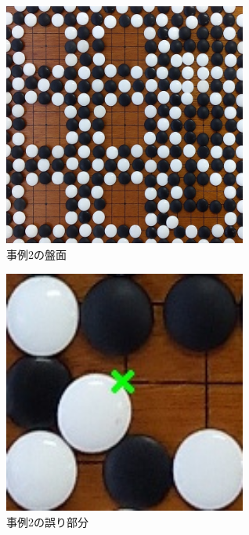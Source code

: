 \documentclass[openright]{nitocs}
\numberwithin{equation}{section}
\begin{document}
                \begin{figure}[tb] %
                    \begin{center}
                    \includegraphics[clip,width=80mm]{DSC_0099/boardImg.jpg} 
                    \caption{事例2の盤面}
                    \label{ex2}
                    \end{center}
                \end{figure}

                \begin{figure}[tb] %
                    \begin{center}
                    \includegraphics[clip,width=80mm]{DSC_0099/TRIM_resultCompare.jpg} 
                    \caption{事例2の誤り部分}
                    \label{ex2_error}
                    \end{center}
                \end{figure}
\end{document}

